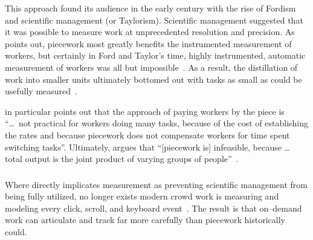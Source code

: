 \documentclass[trackingWork]{subfiles}
\begin{document}
This approach found its audience in the early  century with the rise of Fordism and scientific management (or Taylorism).
Scientific management suggested that it was possible to measure work  at unprecedented resolution and precision.
As \citeauthor{Brown01041990} points out,
piecework most greatly benefits the instrumented measurement of workers,
but certainly in Ford and Taylor's time,
highly instrumented,
automatic measurement of workers was all but impossible~\cite{Brown01041990}.
As a result,
the distillation of work into smaller units ultimately bottomed out with tasks as small as could be usefully measured~\cite{10.2307/23702539}.


\citeauthor{bewley1999wages} in particular points out that
the approach of paying workers by the piece is
``\dots~not practical for workers doing many tasks,
because of
the cost of establishing the rates and because
piecework does not compensate workers for time spent switching tasks''.
Ultimately, \citeauthor{bewley1999wages} argues that
``[piecework is] infeasible,
because \dots
total output is the joint product of varying groups of people''~\cite{bewley1999wages}.


\subsubsection{\whatchanged}
\begin{comment}
outline
	- measurement is more precise,
  so decomposition is deeper
	- not a single position,
  but a marketplace
\end{comment}

Where \citeauthor{10.2307/23702539} directly implicates measurement as
preventing scientific management from being fully utilized,
no longer exists
modern crowd work is measuring and modeling every click,
scroll,
and keyboard event~\cite{rzeszotarski2011instrumenting,rzeszotarski2012crowdscape}.
The result is that on--demand work can articulate and track far more carefully than piecework historically could.
\end{document}
